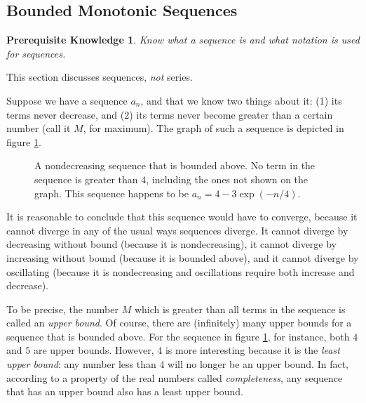 \documentclass{myarticle}
\newcommand\danger{{\fontencoding{U}\fontfamily{futs}\selectfont\char 66\relax}} %
\theoremstyle{nospace}
\newtheorem*{oldprereq}{Prerequisite Knowledge}
\newenvironment{prereq}{\begin{mdframed}\begin{oldprereq}}{\end{oldprereq}\end{mdframed}}
\newtheorem{old series theorem}{Theorem}
\newenvironment{series theorem}{\begin{mdframed}\begin{old series theorem}}{\end{old series theorem}\end{mdframed}}
\begin{document}
\subsection{Bounded Monotonic Sequences} \label{sec:bounded monotonic sequences}

\begin{prereq} Know what a sequence is and what notation is used for sequences. \end{prereq}

\begin{mdframed} \centering \danger

This section discusses sequences, \emph{not} series. \end{mdframed}

Suppose we have a sequence $a_n$, and that we know two things about it: (1) its terms never decrease, and (2) its terms never become greater than a certain number (call it $M$, for maximum). The graph of such a sequence is depicted in figure \ref{fig:bounded monotonic sequence}.

\begin{figure}[htb!] \centering
{}
\caption{A nondecreasing sequence that is bounded above. No term in the sequence is greater than $4$, including the ones not shown on the graph. This sequence happens to be $a_n = 4 - 3\exp(-n/4)$.}
\label{fig:bounded monotonic sequence}
\end{figure}

It is reasonable to conclude that this sequence would have to converge, because it cannot diverge in any of the usual ways sequences diverge. It cannot diverge by decreasing without bound (because it is nondecreasing), it cannot diverge by increasing without bound (because it is bounded above), and it cannot diverge by oscillating (because it is nondecreasing and oscillations require both increase and decrease).

To be precise, the number $M$ which is greater than all terms in the sequence is called an \emph{upper bound}. Of course, there are (infinitely) many upper bounds for a sequence that is bounded above. For the sequence in figure \ref{fig:bounded monotonic sequence}, for instance, both $4$ and $5$ are upper bounds. However, $4$ is more interesting because it is the \emph{least upper bound}: any number less than $4$ will no longer be an upper bound. In fact, according to a property of the real numbers called \emph{completeness}, any sequence that has an upper bound also has a least upper bound.
\end{document}

